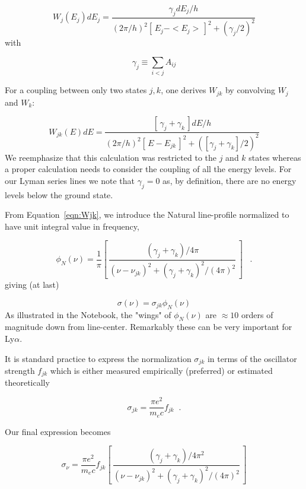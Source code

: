 \documentclass[graybox]{svmult}
\def\lya{Ly$\alpha$}
\def\ltk{\left [ \,}
\def\rtk{\, \right  ] }
\def\perd{\;\;\; .}
\def\smm{\sum\limits}
\begin{document}
\begin{equation}
W_j(E_j) dE_j = \frac{\gamma_j dE_j/h}{(2\pi/h)^2 \ltk E_j - 
<E_j>\rtk^2 + (\gamma_j/2)^2}
\end{equation}
with  

\begin{equation}
\gamma_j \equiv \smm_{i<j} A_{ij}
\end{equation}


For a coupling between only two states $j,k$, one
derives $W_{jk}$ by convolving $W_j$ and $W_k$: 

\begin{equation}
W_{jk}(E) dE = \frac{\ltk \gamma_j + \gamma_k \rtk dE/h}{
(2\pi/h)^2 \ltk E - E_{jk}\rtk^2 + ([\gamma_j + \gamma_k]/2)^2}
\label{eqn:Wjk}
\end{equation}
We reemphasize that this calculation was restricted 
to the $j$ and $k$ states whereas a proper 
calculation needs to consider the coupling of all the 
energy levels.  For our Lyman series lines we
note that $\gamma_j=0$ as, by definition, there are 
no energy levels below the ground state.

From Equation~\ref{eqn:Wjk}, we introduce
the Natural line-profile normalized to have 
unit integral value in frequency,

\begin{equation}
\phi_N(\nu) = \frac{1}{\pi} 
\ltk \frac{(\gamma_j + \gamma_k)/4\pi}{(\nu - \nu_{jk})^2
+ (\gamma_j + \gamma_k)^2 / (4\pi)^2} \rtk \perd
\end{equation}
giving (at last)

\begin{equation}
\sigma(\nu) = \sigma_{jk} \phi_N(\nu)
\end{equation}
As illustrated in the Notebook, 
the "wings" of $\phi_N(\nu)$ are 
$\approx 10$ orders of magnitude down 
from line-center.  Remarkably
these can be very important for \lya.

It is standard practice to express the normalization
$\sigma_{jk}$ in terms of the oscillator strength $f_{jk}$
which is either measured empirically (preferred)
or estimated theoretically

\begin{equation}
\sigma_{jk} = \frac{\pi e^2}{m_e c} f_{jk} \;\; .
\end{equation}

Our final expression becomes

\begin{equation}
\sigma_\nu = \frac{\pi e^2}{m_e c} f_{jk} 
\ltk \frac{(\gamma_j + \gamma_k)/4\pi^2}{(\nu - \nu_{jk})^2
+ (\gamma_j + \gamma_k)^2 / (4\pi)^2} \rtk
\end{equation}
\end{document}
